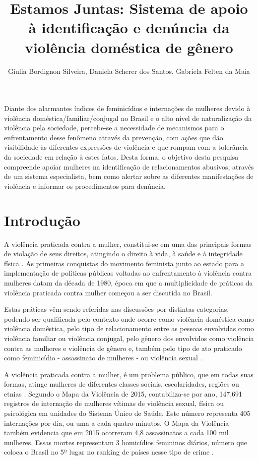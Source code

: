 \documentclass[12pt]{article}
\title{Estamos Juntas: Sistema de apoio à identificação e denúncia da violência doméstica de gênero}
\author{Gíulia Bordignon Silveira\inst{1}, Daniela Scherer dos Santos\inst{1}, Gabriela Felten da Maia\inst{2}}
\begin{document}
 

\maketitle
     
\begin{resumo} %
  
Diante dos alarmantes índices de feminicídios e internações de mulheres devido à violência doméstica/familiar/conjugal no Brasil e o alto nível de naturalização da violência pela sociedade, percebe-se a necessidade de mecanismos para o enfrentamento desse fenômeno através da prevenção, com ações que dão visibilidade às diferentes expressões de violência e que rompam com a tolerância da sociedade em relação à estes fatos. Desta forma, o objetivo desta pesquisa compreende apoiar mulheres na identificação de relacionamentos abusivos, através de um sistema especialista, bem como alertar sobre as diferentes manifestações de violência e informar os procedimentos para denúncia.

\end{resumo}%

\section{Introdução }

A violência praticada contra a mulher, constitui-se em uma das principais formas de violação de seus direitos, atingindo o direito à vida, à saúde e à integridade física \cite{pactonacional}. As primeiras conquistas do movimento feminista junto ao estado para a implementação de políticas públicas voltadas ao enfrentamento à violência contra mulheres datam da década de 1980, época em que a multiplicidade de práticas da violência praticada contra mulher começou a ser discutida no Brasil.

Estas práticas vêm sendo referidas nas discussões por distintas categorias, podendo ser qualificada pelo contexto onde ocorre como violência doméstica como violência domêstica, pelo tipo de relacionamento entre as pessoas envolvidas como violência familiar ou violência conjugal, pelo  gênero  dos envolvidos como violência contra as mulheres e violência de gênero e, também pelo tipo de ato praticado como feminicídio - assassinato de mulheres - ou violência sexual \cite{Izumino2003}. 

A violência praticada contra a mulher, é um problema público, que em todas suas formas, atinge mulheres de diferentes classes sociais, escolaridades, regiões ou etnias \cite{pactonacional}. Segundo o Mapa da Violência de 2015, contabiliza-se por ano, 147.691 registros de internação de mulheres vítimas de violência sexual, física ou psicológica em unidades do Sistema Único de Saúde. Este número representa 405 internações por dia, ou uma a cada quatro minutos. O Mapa da Violência também evidencia que em 2015 ocorreram 4,8 assassinatos a cada 100 mil mulheres. Essas mortes representam 3 homicídios femininos diários, número que coloca o Brasil no 5º lugar no ranking de países nesse tipo de crime \cite{Brasil2015}. 
\end{document}
